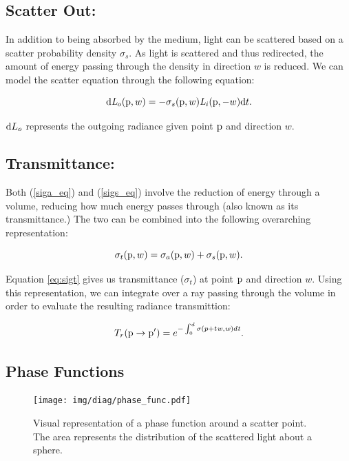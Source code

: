 \documentclass[12pt]{ucthesis}
\newcommand{\captionfonts}{\small\bf\ssp}
\begin{document}
\subsection{Scatter Out:}
In addition to being absorbed by the medium, light can be scattered based on a scatter probability density $\sigma_{s}$.  As light is scattered and thus redirected, the amount of energy passing through the density in direction $w$ is reduced.  We can model the scatter equation through the following equation:

\begin{equation}
\textup{d}\mathit{L}_{o}(\textup{p},w) = -\sigma_{s}(\textup{p},w) \mathit{L}_{i}(\textup{p},-w)\textup{d}t.
\label{sigs_eq}
\end{equation}

$\textup{d}L_{o}$ represents the outgoing radiance given point $\textup{p}$ and direction $w$.

\subsection{Transmittance:}
Both (\ref{siga_eq}) and (\ref{sigs_eq}) involve the reduction of energy through a volume, reducing how much energy passes through (also known as its transmittance.)  The two can be combined into the following overarching representation:

\begin{equation}
\sigma_{t}(\textup{p},w) = \sigma_{a}(\textup{p},w) + \sigma_{s}(\textup{p}, w).
\label{eq:sigt}
\end{equation}

Equation \ref{eq:sigt} gives us transmittance ($\sigma_{t}$) at point $\textup{p}$ and direction $w$.  Using this representation, we can integrate over a ray passing through the volume in order to evaluate the resulting radiance transmittion:

\begin{equation}
T_{r}(\textup{p} \to \textup{p}') = e^{-\int_{0}^{d}\sigma (p+t\mathit{w},\mathit{w})d\mathit{t}}.
\label{transmittion_eq}
\end{equation}

\subsection{Phase Functions}

\begin{figure}[h!]
    \centering
    \texttt{[image: img/diag/phase\_func.pdf]}
    \captionfonts
    \caption{Visual representation of a phase function around a scatter point.  The area represents the distribution of the scattered light about a sphere.}
    \label{fig:phase}
\end{figure}
\end{document}
